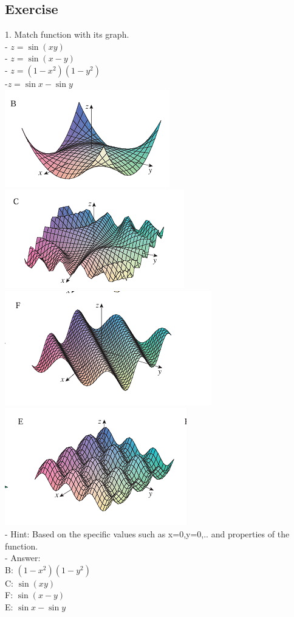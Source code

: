 \documentclass[12pt]{article}
\begin{document}
\subsection{Exercise}
1. Match function with its graph.\\
   - $z=\sin(xy)$ \\
   - $z = \sin(x-y)$ \\
   - $z = (1-x^2)(1-y^2)$\\
   -$z = \sin x - \sin y $\\
   \includegraphics[scale=1]{1.png}
   \includegraphics[scale=1]{2.png}\\
   \includegraphics[scale=1]{3.png}
   \includegraphics[scale=1]{4.png}\\
   - Hint: Based on the specific values such as x=0,y=0,.. and properties of the function.\\ 
   - Answer: \\B: $(1-x^2)(1-y^2)$\\
             C: $\sin(xy)$\\
             F: $\sin(x-y)$ \\
             E: $\sin x - \sin y $\\
\end{document}

